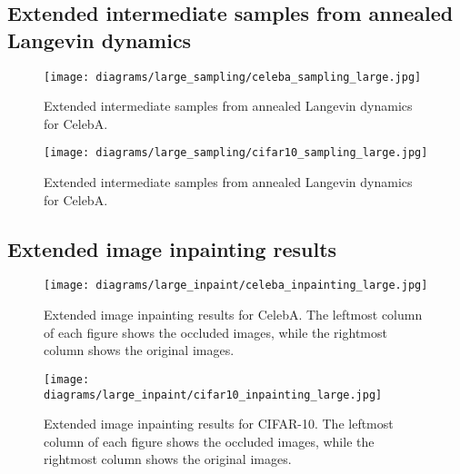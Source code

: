 \documentclass{article}
\begin{document}
\subsection{Extended intermediate samples from annealed Langevin dynamics}
\vspace*{\fill}
\FloatBarrier
\begin{figure}[H]
    \centering
    \texttt{[image: diagrams/large\_sampling/celeba\_sampling\_large.jpg]}
    \caption{Extended intermediate samples from annealed Langevin dynamics for CelebA.}
\end{figure}
\begin{figure}[H]
    \centering
    \texttt{[image: diagrams/large\_sampling/cifar10\_sampling\_large.jpg]}
    \caption{Extended intermediate samples from annealed Langevin dynamics for CelebA.}
\end{figure}
\FloatBarrier
\vfill
\newpage
\subsection{Extended image inpainting results}\label{app:inpainting}
\vspace*{\fill}
\FloatBarrier
\begin{figure}[H]
    \centering
    \texttt{[image: diagrams/large\_inpaint/celeba\_inpainting\_large.jpg]}
    \caption{Extended image inpainting results for CelebA. The leftmost column of each figure shows the occluded images, while the rightmost column shows the original images.}
\end{figure}
\FloatBarrier
\vfill
\newpage
\vspace*{\fill}
\FloatBarrier
\begin{figure}[H]
    \centering
    \texttt{[image: diagrams/large\_inpaint/cifar10\_inpainting\_large.jpg]}
    \caption{Extended image inpainting results for CIFAR-10. The leftmost column of each figure shows the occluded images, while the rightmost column shows the original images.}
\end{figure}
\FloatBarrier
\vfill 
\end{document}

